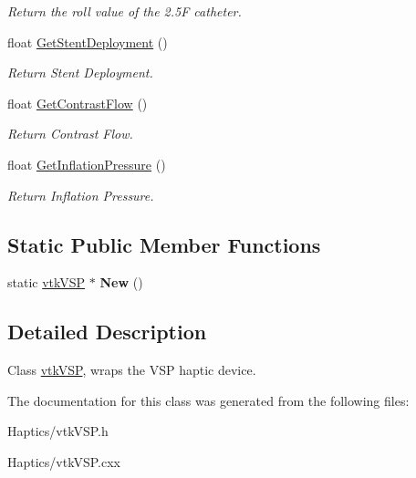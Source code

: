 \begin{DoxyCompactItemize}
\begin{DoxyCompactList}\small\item\em Return the roll value of the 2.5F catheter. \item\end{DoxyCompactList}\item 
\hypertarget{classvtkVSP_a47ca891db4ba2d8b6f06cbfafcb07152}{
float \hyperlink{classvtkVSP_a47ca891db4ba2d8b6f06cbfafcb07152}{GetStentDeployment} ()}
\label{classvtkVSP_a47ca891db4ba2d8b6f06cbfafcb07152}

\begin{DoxyCompactList}\small\item\em Return Stent Deployment. \item\end{DoxyCompactList}\item 
\hypertarget{classvtkVSP_a36c67b53377b842de0baa568b62cea8a}{
float \hyperlink{classvtkVSP_a36c67b53377b842de0baa568b62cea8a}{GetContrastFlow} ()}
\label{classvtkVSP_a36c67b53377b842de0baa568b62cea8a}

\begin{DoxyCompactList}\small\item\em Return Contrast Flow. \item\end{DoxyCompactList}\item 
\hypertarget{classvtkVSP_a75642238e29ebd171de9c9786eac0361}{
float \hyperlink{classvtkVSP_a75642238e29ebd171de9c9786eac0361}{GetInflationPressure} ()}
\label{classvtkVSP_a75642238e29ebd171de9c9786eac0361}

\begin{DoxyCompactList}\small\item\em Return Inflation Pressure. \item\end{DoxyCompactList}\end{DoxyCompactItemize}
\subsection*{Static Public Member Functions}
\begin{DoxyCompactItemize}
\item 
\hypertarget{classvtkVSP_a0b460a3fa8f71d1b027471d7e171c68e}{
static \hyperlink{classvtkVSP}{vtkVSP} $\ast$ {\bfseries New} ()}
\label{classvtkVSP_a0b460a3fa8f71d1b027471d7e171c68e}

\end{DoxyCompactItemize}


\subsection{Detailed Description}
Class \hyperlink{classvtkVSP}{vtkVSP}, wraps the VSP haptic device. 

The documentation for this class was generated from the following files:\begin{DoxyCompactItemize}
\item 
Haptics/vtkVSP.h\item 
Haptics/vtkVSP.cxx\end{DoxyCompactItemize}
